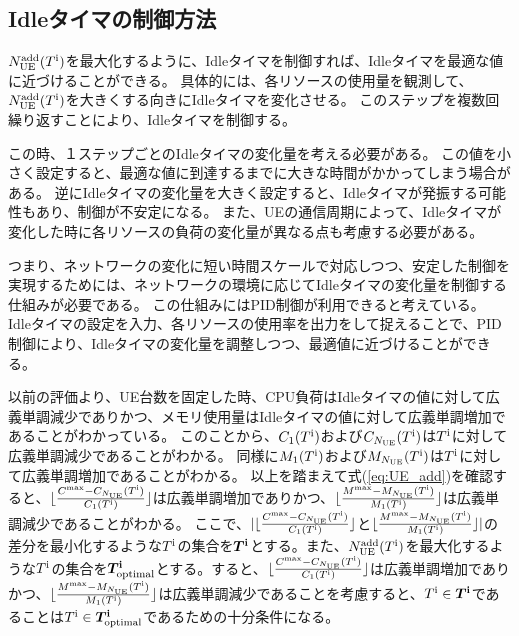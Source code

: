 \documentclass[a4j]{ujarticle}
\begin{document}
\subsection{Idleタイマの制御方法}
\label{sec:control}
$N_{\rm UE}^{\rm add}(T^{\rm i})$を最大化するように、Idleタイマを制御すれば、Idleタイマを最適な値に近づけることができる。
具体的には、各リソースの使用量を観測して、$N_{\rm UE}^{\rm add}(T^{\rm i})$を大きくする向きにIdleタイマを変化させる。
このステップを複数回繰り返すことにより、Idleタイマを制御する。

この時、１ステップごとのIdleタイマの変化量を考える必要がある。
この値を小さく設定すると、最適な値に到達するまでに大きな時間がかかってしまう場合がある。
逆にIdleタイマの変化量を大きく設定すると、Idleタイマが発振する可能性もあり、制御が不安定になる。
また、UEの通信周期によって、Idleタイマが変化した時に各リソースの負荷の変化量が異なる点も考慮する必要がある。

つまり、ネットワークの変化に短い時間スケールで対応しつつ、安定した制御を実現するためには、ネットワークの環境に応じてIdleタイマの変化量を制御する仕組みが必要である。
この仕組みにはPID制御が利用できると考えている。
Idleタイマの設定を入力、各リソースの使用率を出力をして捉えることで、PID制御により、Idleタイマの変化量を調整しつつ、最適値に近づけることができる。

以前の評価より、UE台数を固定した時、CPU負荷はIdleタイマの値に対して広義単調減少でありかつ、メモリ使用量はIdleタイマの値に対して広義単調増加であることがわかっている。
このことから、$C_{1}(T^{\rm i})$および$C_{N_{\rm UE}}(T^{\rm i})$は$T^{\rm i}$に対して広義単調減少であることがわかる。
同様に$M_{1}(T^{\rm i})$および$M_{N_{\rm UE}}(T^{\rm i})$は$T^{\rm i}$に対して広義単調増加であることがわかる。
以上を踏まえて式(\ref{eq:UE_add})を確認すると、$\lfloor \frac{C^{\rm max} - C_{N_{\rm UE}}(T^{\rm i})}{C_{1}(T^{\rm i})} \rfloor$は広義単調増加でありかつ、$\lfloor \frac{M^{\rm max} - M_{N_{\rm UE}}(T^{\rm i})}{M_{1}(T^{\rm i})} \rfloor$は広義単調減少であることがわかる。
ここで、$|\lfloor \frac{C^{\rm max} - C_{N_{\rm UE}}(T^{\rm i})}{C_{1}(T^{\rm i})} \rfloor$と$\lfloor \frac{M^{\rm max} - M_{N_{\rm UE}}(T^{\rm i})}{M_{1}(T^{\rm i})} \rfloor|$の差分を最小化するような$T^{\rm i}$の集合を$\bm{T^{\rm i}}$とする。また、$N_{\rm UE}^{\rm add}(T^{\rm i})$を最大化するような$T^{\rm i}$の集合を$\bm{T^{\rm i}}_{\rm optimal}$とする。すると、$\lfloor \frac{C^{\rm max} - C_{N_{\rm UE}}(T^{\rm i})}{C_{1}(T^{\rm i})} \rfloor$は広義単調増加でありかつ、$\lfloor \frac{M^{\rm max} - M_{N_{\rm UE}}(T^{\rm i})}{M_{1}(T^{\rm i})} \rfloor$は広義単調減少であることを考慮すると、$T^{\rm i}\in\bm{T^{\rm i}}$であることは$T^{\rm i}\in\bm{T^{\rm i}}_{\rm optimal}$であるための十分条件になる。
\end{document}
